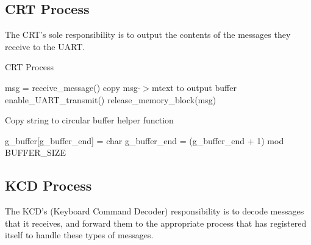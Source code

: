 \documentclass[12pt]{report}
\begin{document}
\subsection{CRT Process}

The CRT's sole responsibility is to output the contents of the messages they receive to the UART.

\begin{algorithm}[H]
	\caption{CRT Process}
	\begin{algorithmic}[1]
	      \State msg = receive\_message()
	      \State copy msg-$>$mtext to output buffer
	      \State enable\_UART\_transmit()
	      \State release\_memory\_block(msg)
	    \EndWhile
	  \EndFunction
	\end{algorithmic}
\end{algorithm}

\begin{algorithm}[H]
	\caption{Copy string to circular buffer helper function}
	\begin{algorithmic}[1]
	      \State g_buffer[g_buffer_end] = char
	      \State g_buffer_end = (g_buffer_end + 1) mod BUFFER_SIZE
	    \EndFor
	  \EndFunction
	\end{algorithmic}
\end{algorithm}

\subsection{KCD Process}

The KCD's (Keyboard Command Decoder) responsibility is to decode messages that it receives, and forward them to the appropriate process that has registered itself to handle these types of messages.
\end{document}
